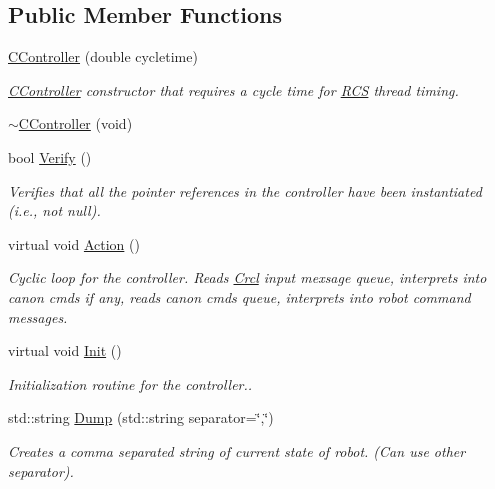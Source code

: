 \subsection*{Public Member Functions}
\begin{DoxyCompactItemize}
\item 
\hyperlink{structRCS_1_1CController_acf0744408b45b6d9f60cb44c9d64f1a8}{C\-Controller} (double cycletime)
\begin{DoxyCompactList}\small\item\em \hyperlink{structRCS_1_1CController}{C\-Controller} constructor that requires a cycle time for \hyperlink{namespaceRCS}{R\-C\-S} thread timing. \end{DoxyCompactList}\item 
\hyperlink{structRCS_1_1CController_a2bfe656f4d6a26d3dc4556ed8dab118a}{$\sim$\-C\-Controller} (void)
\item 
bool \hyperlink{structRCS_1_1CController_a7f04bc3e6f36033b2ea18bbac9c34a64}{Verify} ()
\begin{DoxyCompactList}\small\item\em Verifies that all the pointer references in the controller have been instantiated (i.\-e., not null). \end{DoxyCompactList}\item 
virtual void \hyperlink{structRCS_1_1CController_a5629103a842e2c1d451fec16471f7639}{Action} ()
\begin{DoxyCompactList}\small\item\em Cyclic loop for the controller. Reads \hyperlink{namespaceCrcl}{Crcl} input mexsage queue, interprets into canon cmds if any, reads canon cmds queue, interprets into robot command messages. \end{DoxyCompactList}\item 
virtual void \hyperlink{structRCS_1_1CController_ad26d222b33f2b043f8a8d8b2b17bac01}{Init} ()
\begin{DoxyCompactList}\small\item\em Initialization routine for the controller.. \end{DoxyCompactList}\item 
std\-::string \hyperlink{structRCS_1_1CController_aa7c4b106c4fb8064d896ccad7ce25b46}{Dump} (std\-::string separator=\char`\"{},\char`\"{})
\begin{DoxyCompactList}\small\item\em Creates a comma separated string of current state of robot. (Can use other separator). \end{DoxyCompactList}\item 

\end{DoxyCompactItemize}

